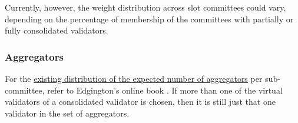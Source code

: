 Currently, however, the weight distribution across slot committees could vary, depending on the percentage of membership of the committees with partially or fully consolidated validators.
\subsubsection*{Aggregators}
For the \href{https://eth2book.info/capella/part2/building_blocks/aggregator/}{existing distribution of the expected number of aggregators} per sub-committee, refer to Edgington's online book \cite{Edgington2023}.
If more than one of the virtual validators of a consolidated validator is chosen, then it is still just that one validator in the set of aggregators. 
